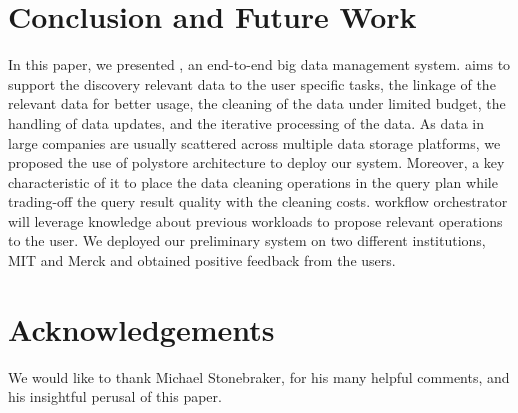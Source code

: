 \section{Conclusion and Future Work}
\label{sec:conclusion}

In this paper, we presented \dcv,  an end-to-end big data management system.
\dcv aims to support 
the discovery relevant data to the user specific tasks, 
the linkage of the relevant data for better usage, 
the cleaning of the data under limited budget, 
the handling of  data updates, 
and the iterative processing of the data. 
As data in large companies are usually scattered across multiple
data storage platforms, we proposed the use of polystore architecture to deploy our system.
Moreover, a key characteristic of \dcv it to place the data cleaning operations in the query plan
while  trading-off the query result quality with the cleaning costs. 
\dcv workflow orchestrator will leverage knowledge about previous workloads to propose relevant operations to the user.
We deployed our preliminary system on two different institutions, MIT and Merck and obtained positive
feedback from the users.

\section{Acknowledgements}

We would like to thank Michael Stonebraker, for his many helpful comments, and his insightful perusal of this paper.


